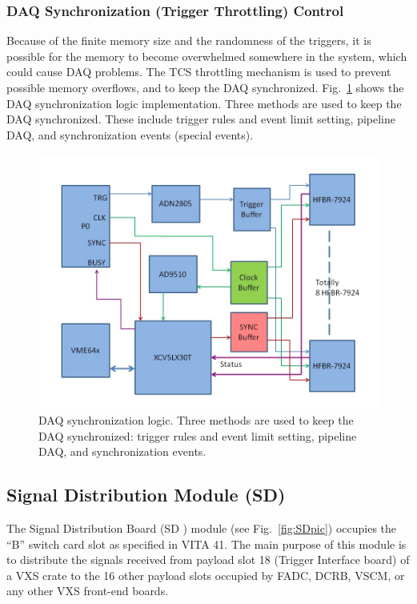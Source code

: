 \subsubsection{DAQ Synchronization (Trigger Throttling) Control}

Because of the finite memory size and the randomness of the triggers, it is possible for the memory to become overwhelmed somewhere in the system, which could cause DAQ problems.   The TCS throttling mechanism is used to prevent possible memory overflows, and to keep the DAQ synchronized.  Fig.~\ref{fig:DAQ_synchronization} shows the DAQ synchronization logic implementation.  Three methods are used to keep the DAQ synchronized.  These include trigger rules and event limit setting, pipeline DAQ, and synchronization events (special events).

\begin{figure}[hbt]
	\centering
	\includegraphics[width=1.0\columnwidth,keepaspectratio]{img/TDdiagram.jpg}
	\caption{DAQ synchronization logic. Three methods are used to keep the DAQ synchronized: trigger rules and event limit setting, pipeline DAQ, and synchronization events.}
	\label{fig:DAQ_synchronization}
\end{figure}

	
\subsection{Signal Distribution Module (SD)}

The Signal Distribution Board (SD \cite{sd-ref}) module (see Fig.~\ref{fig:SDpic}) occupies the “B” switch card slot as specified in VITA 41. The main purpose of this module is to distribute the signals received from payload slot 18 (Trigger Interface board) of a VXS crate to the 16 other payload slots occupied by FADC, DCRB, VSCM, or any other VXS front-end boards.

